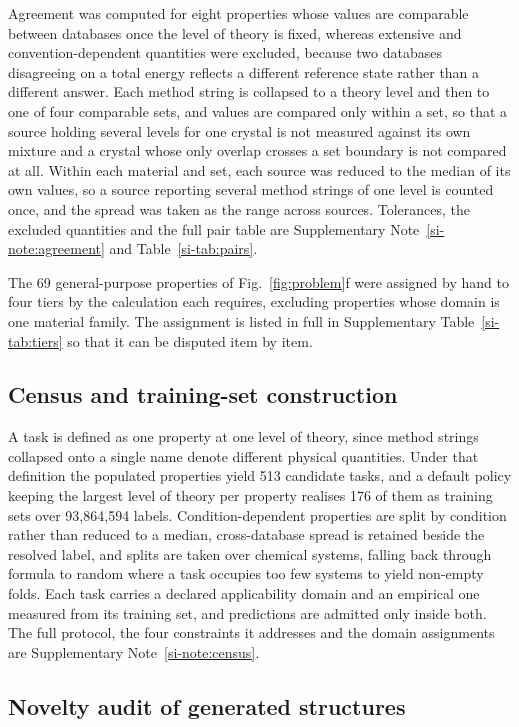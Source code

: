 Agreement was computed for eight properties whose values are comparable between
databases once the level of theory is fixed, whereas extensive and
convention-dependent quantities were excluded, because two databases disagreeing
on a total energy reflects a different reference state rather than a different
answer. Each method string is collapsed to a theory level and then to one of four
comparable sets, and values are compared only within a set, so that a source
holding several levels for one crystal is not measured against its own mixture
and a crystal whose only overlap crosses a set boundary is not compared at all.
Within each material and set, each source was reduced to the median of its own
values, so a source reporting several method strings of one level is counted
once, and the spread was taken as the range across sources. Tolerances, the excluded quantities and the full pair table are
Supplementary Note~\ref{si-note:agreement} and Table~\ref{si-tab:pairs}.

The 69 general-purpose properties of Fig.~\ref{fig:problem}f were assigned by
hand to four tiers by the calculation each requires, excluding properties whose
domain is one material family. The assignment is listed in full in Supplementary
Table~\ref{si-tab:tiers} so that it can be disputed item by item.

\subsection{Census and training-set construction}

A task is defined as one property at one level of theory, since method strings
collapsed onto a single name denote different physical quantities. Under that
definition the populated properties yield 513 candidate tasks, and a default
policy keeping the largest level of theory per property realises 176 of them as
training sets over 93{,}864{,}594 labels. Condition-dependent properties are
split by condition rather than reduced to a median, cross-database spread is
retained beside the resolved label, and splits are taken over chemical systems,
falling back through formula to random where a task occupies too few systems to
yield non-empty folds. Each task carries a declared applicability domain and an
empirical one measured from its training set, and predictions are admitted only
inside both. The full protocol, the four constraints it addresses and the domain
assignments are Supplementary Note~\ref{si-note:census}.

\subsection{Novelty audit of generated structures}

